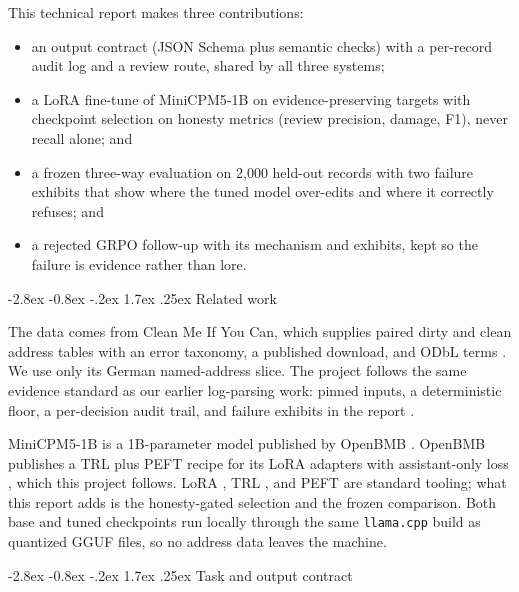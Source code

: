 \documentclass[11pt]{article}
\makeatletter
\renewcommand\section{\@startsection{section}{1}{\z@}%
  {-2.8ex \@plus -0.8ex \@minus -.2ex}%
  {1.7ex \@plus .25ex}%
  {\normalfont\Large\bfseries}}
\makeatother
\begin{document}
This technical report makes three contributions:
\begin{itemize}
\item an output contract (JSON Schema plus semantic checks) with a
per-record audit log and a review route, shared by all three systems;
\item a LoRA fine-tune of MiniCPM5-1B on evidence-preserving targets
with checkpoint selection on honesty metrics (review precision,
damage, F1), never recall alone; and
\item a frozen three-way evaluation on 2,000 held-out records with two
failure exhibits that show where the tuned model over-edits and where
it correctly refuses; and
\item a rejected GRPO follow-up with its mechanism and exhibits, kept
so the failure is evidence rather than lore.
\end{itemize}

\section{Related work}
\label{sec:related}

The data comes from Clean Me If You Can, which supplies paired dirty
and clean address tables with an error taxonomy, a published download,
and ODbL terms \cite{cleanme, addressdoi}. We use only its German
named-address slice. The project follows the same evidence standard as
our earlier log-parsing work: pinned inputs, a deterministic floor, a
per-decision audit trail, and failure exhibits in the report
\cite{trail}.

MiniCPM5-1B is a 1B-parameter model published by OpenBMB
\cite{minicpm-card, minicpm-paper}. OpenBMB publishes a TRL plus PEFT
recipe for its LoRA adapters with assistant-only loss
\cite{minicpm-trl}, which this project follows. LoRA \cite{lora},
TRL \cite{trl}, and PEFT \cite{peft} are standard tooling; what this
report adds is the honesty-gated selection and the frozen comparison. Both base and tuned checkpoints
run locally through the same \texttt{llama.cpp} build
\cite{llamacpp} as quantized GGUF files, so no address data leaves the
machine.

\section{Task and output contract}
\label{sec:contract}
\end{document}
